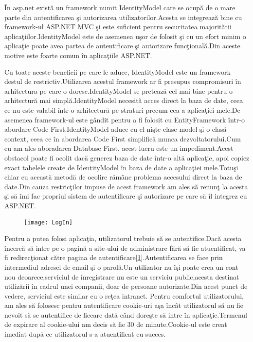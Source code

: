 \documentclass[a4paper,12pt]{report}
\let\oldref\ref
\renewcommand{\ref}[1]{[\oldref{#1}]}
\begin{document}
\^In asp.net exist\u a un framework numit IdentityModel care se ocup\u a de o mare parte din autentificarea \c si autorizarea
utilizatorilor.Acesta se integreaz\u a bine cu framework-ul ASP.NET MVC \c si este suficient pentru securitatea majorit\u atii 
aplica\c tiilor.IdentityModel este de asemenea u\c sor de folosit \c si cu un efort minim o aplica\c tie poate avea partea de 
autentificare \c si autorizare func\c tional\u a.Din aceste motive este foarte comun \^in aplica\c tiile ASP.NET.

Cu toate aceste beneficii pe care le aduce, IdentityModel este un framework destul de restrictiv.Utilizarea acestul framework
ar fi presupus compromisuri \^in arhitectura pe care o doresc.IdentityModel se preteaz\u a cel mai bine pentru o arhitectur\u a
mai simpl\u a.IdentityModel necesit\u a acces direct la baza de date, ceea ce nu este valabil \^intr-o arhitectur\u a pe straturi
precum cea a aplica\c tiei mele.De asemenea framework-ul este g\^andit pentru a fi folosit cu EntityFramework \^intr-o abordare 
Code First.IdentityModel aduce cu el ni\c ste clase model \c si o clas\u a context, ceea ce \^in abordarea Code First simplific\u a
munca dezvoltatorului.Cum eu am ales aboradarea Database First, acest lucru este un impediment.Acest obstacol poate fi 
ocolit dac\u a generez baza de date \^intr-o alt\u a aplica\c tie, apoi copiez exact tabelele create de IdentityModel \^in 
baza de date a aplica\c tiei mele.Totu\c si chiar cu aceast\u a metod\u a de ocolire r\u am\^ane problema accesului direct
la baza de date.Din cauza restric\c tilor impuse de acest framework am ales s\u a renun\c t la acesta \c si s\u a \^imi fac 
propriul sistem de autentificare \c si autorizare pe care s\u a \^il integrez cu ASP.NET.

\begin{figure}[ht]
	\texttt{[image: LogIn]}
	\label{fig:LogIn}
\end{figure}
Pentru a putea folosi aplica\c tia, utilizatorul trebuie s\u a se autentifice.Dac\u a acesta \^incerc\u a s\u a intre pe o pagin\u a a site-ului
de administrare f\u ar\u a s\u a fie atuentificat, va fi redirec\c tionat c\u atre pagina de autentificare\ref{fig:LogIn}.Autentificarea se face prin 
intermediul adresei de email \c si o parol\u a.Un utilizator nu \^i\c si poate crea un cont nou deoarece,serviciul 
de \^inregistrare nu este un serviciu public,acesta destinat utiliz\u arii \^in cadrul unei companii, doar de 
persoane autorizate.Din acest punct de vedere, serviciul este similar cu o re\c tea intranet.
Pentru comfortul utilizatorului, am ales s\u a folosesc pentru autentificare cookie-uri a\c sa \^inc\^at
utilizatorul s\u a nu fie nevoit s\u a se autentifice de fiecare dat\u a c\^and dore\c ste s\u a intre \^in
aplica\c tie.Termenul de expirare al cookie-ului am decis s\u a fie 30 de minute.Cookie-ul este creat imediat dup\u a ce 
utilizatorul s-a atuentificat cu succes.
\end{document}
